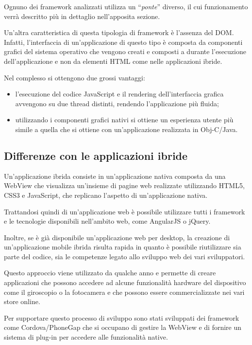 Ognuno dei framework analizzati utilizza un ``\textit{ponte}'' diverso, il cui funzionamento verrà descritto più in dettaglio nell'apposita sezione.

Un'altra caratteristica di questa tipologia di framework è l'assenza del \gls{DOM}.
Infatti, l'interfaccia di un'applicazione di questo tipo è composta da componenti grafici del sistema operativo che vengono creati e composti a durante l'esecuzione dell'applicazione e non da elementi HTML come nelle applicazioni ibride.

Nel complesso si ottengono due grossi vantaggi:
\begin{itemize}
\item l'esecuzione del codice JavaScript e il \gls{rendering} dell'interfaccia grafica avvengono su due thread distinti, rendendo l'applicazione più fluida;
\item utilizzando i componenti grafici nativi si ottiene un esperienza utente più simile a quella che si ottiene con un'applicazione realizzata in \gls{Obj-C}/Java.
\end{itemize}

\subsection{Differenze con le applicazioni ibride}

Un'applicazione ibrida consiste in un'applicazione nativa composta da una \gls{WebView} che visualizza un'insieme di pagine web realizzate utilizzando HTML5, CSS3 e JavaScript, che replicano l'aspetto di un'applicazione nativa.

Trattandosi quindi di un'applicazione web è possibile utilizzare tutti i framework e le tecnologie disponibili nell'ambito web, come AngularJS o jQuery.

Inoltre, se è già disponibile un'applicazione web per desktop, la creazione di un'applicazione mobile ibrida risulta rapida in quanto è possibile riutilizzare sia parte del codice, sia le competenze legato allo sviluppo web dei vari sviluppatori.

Questo approccio viene utilizzato da qualche anno e permette di creare applicazioni che possono accedere ad alcune funzionalità hardware del dispositivo come il giroscopio o la fotocamera e che possono essere commercializzate nei vari store online.

Per supportare questo processo di sviluppo sono stati sviluppati dei framework come Cordova/\gls{PhoneGap} che si occupano di gestire la WebView e di fornire un sistema di plug-in per accedere alle funzionalità native.

